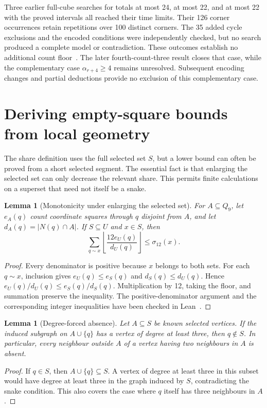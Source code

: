 \documentclass[11pt,a4paper]{article}
\newtheorem{lemma}[theorem]{Lemma}
\theoremstyle{definition}
\theoremstyle{remark}
\newcommand{\Q}{Q}
\begin{document}
Three earlier full-cube searches for totals at most 24, at most 22, and at most 22
with the proved intervals all reached their time limits. Their 126 corner
occurrences retain repetitions over 100 distinct corners. The 35 added
cycle exclusions and the encoded conditions were independently checked,
but no search produced a complete model or contradiction. These outcomes
establish no additional count floor~\cite{criticalsixarchive}. The later
fourth-count-three result closes that case, while the complementary case
$\alpha_{r+4}\ge4$ remains unresolved. Subsequent encoding changes and
partial deductions provide no exclusion of this complementary case.


\section{Deriving empty-square bounds from local geometry}\label{sec:forced-charge}
The share definition uses the full selected set $S$, but a lower bound can often be proved from a short selected segment. The essential fact is that enlarging the selected set can only decrease the relevant share. This permits finite calculations on a superset that need not itself be a snake.

\begin{lemma}[Monotonicity under enlarging the selected set]\label{lem:share-monotonicity}
For $A\subseteq\Q_9$, let $e_A(q)$ count coordinate squares through $q$ disjoint from $A$, and let $d_A(q)=|N(q)\cap A|$. If $S\subseteq U$ and $x\in S$, then
\[
\sum_{q\sim x}\left\lfloor\frac{12e_U(q)}{d_U(q)}\right\rfloor
\le\sigma_{12}(x).
\]
\end{lemma}
\begin{proof}
Every denominator is positive because $x$ belongs to both sets. For each $q\sim x$, inclusion gives $e_U(q)\le e_S(q)$ and $d_S(q)\le d_U(q)$. Hence $e_U(q)/d_U(q)\le e_S(q)/d_S(q)$. Multiplication by 12, taking the floor, and summation preserve the inequality. The positive-denominator argument and the corresponding integer inequalities have been checked in Lean~\cite{geometricarchive}.
\end{proof}

\begin{lemma}[Degree-forced absence]\label{lem:degree-forced}
Let $A\subseteq S$ be known selected vertices. If the induced subgraph on $A\cup\{q\}$ has a vertex of degree at least three, then $q\notin S$. In particular, every neighbour outside $A$ of a vertex having two neighbours in $A$ is absent.
\end{lemma}
\begin{proof}
If $q\in S$, then $A\cup\{q\}\subseteq S$. A vertex of degree at least three in this subset would have degree at least three in the graph induced by $S$, contradicting the snake condition. This also covers the case where $q$ itself has three neighbours in $A$.
\end{proof}
\end{document}
